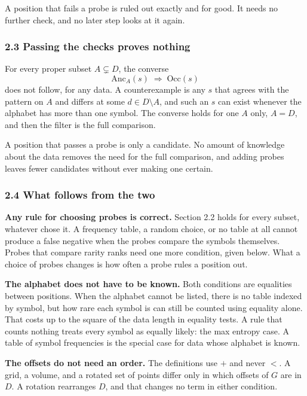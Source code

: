 A position that fails a probe is ruled out exactly and for good. It needs no further check, and no later step looks at it again.

\subsubsection{2.3 Passing the checks proves nothing}

For every proper subset \(A \subsetneq D\), the converse
\[
  \mathrm{Anc}_A(s) \;\Longrightarrow\; \mathrm{Occ}(s)
\]
does not follow, for any data. A counterexample is any \(s\) that agrees with the pattern on \(A\) and differs at some \(d \in D \setminus A\), and such an \(s\) can exist whenever the alphabet has more than one symbol. The converse holds for one \(A\) only, \(A = D\), and then the filter is the full comparison.

A position that passes a probe is only a candidate. No amount of knowledge about the data removes the need for the full comparison, and adding probes leaves fewer candidates without ever making one certain.

\subsubsection{2.4 What follows from the two}

\noindent\textbf{Any rule for choosing probes is correct.} Section 2.2 holds for every subset, whatever chose it. A frequency table, a random choice, or no table at all cannot produce a false negative when the probes compare the symbols themselves. Probes that compare rarity ranks need one more condition, given below. What a choice of probes changes is how often a probe rules a position out.

\noindent\textbf{The alphabet does not have to be known.} Both conditions are equalities between positions. When the alphabet cannot be listed, there is no table indexed by symbol, but how rare each symbol is can still be counted using equality alone. That costs up to the square of the data length in equality tests. A rule that counts nothing treats every symbol as equally likely: the max entropy case. A table of symbol frequencies is the special case for data whose alphabet is known.

\noindent\textbf{The offsets do not need an order.} The definitions use \(+\) and never \(<\). A grid, a volume, and a rotated set of points differ only in which offsets of \(G\) are in \(D\). A rotation rearranges \(D\), and that changes no term in either condition.

